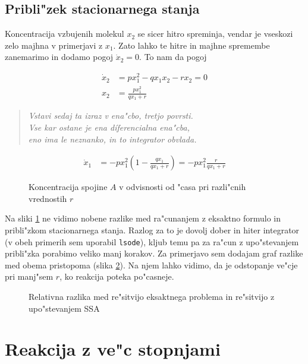 \documentclass[a4paper,10pt]{article}
\begin{document}
\subsection{Pribli"zek stacionarnega stanja}
Koncentracija vzbujenih molekul $x_2$ se sicer hitro spreminja, vendar je vseskozi zelo majhna v primerjavi z $x_1$. Zato lahko te hitre in majhne spremembe zanemarimo in dodamo pogoj $\dot x_2 = 0$. To nam da pogoj

\begin{align}
 \dot x_2 &= p x_1^2 - q x_1 x_2 - r x_2 = 0\\
 x_2 &= \frac{px_1^2}{qx_1 + r}
\end{align}

\begin{verse}
\textit{Vstavi sedaj ta izraz v ena"cbo, tretjo povrsti. \\%
Vse kar ostane je ena d\'iferencialna ena"cba, \\
eno ima le neznanko, in to integrator obvlada. }
\end{verse}

\begin{align}
\dot x_1 &= -p x_1^2 \left( 1 - \frac{qx_1}{qx_1 + r} \right) = -px_1^2 \frac{r}{qx_1 + r}
\end{align}

\begin{figure}
 
  \caption{Koncentracija spojine $A$ v odvisnosti od "casa pri razli"cnih vrednostih $r$}
  \label{fig:binarna}
\end{figure}

Na sliki \ref{fig:binarna} ne vidimo nobene razlike med ra"cunanjem z eksaktno formulo in pribli"zkom stacionarnega stanja. Razlog za to je dovolj dober in hiter integrator (v obeh primerih sem uporabil \texttt{lsode}), kljub temu pa za ra"cun z upo"stevanjem pribli"zka porabimo veliko manj korakov. Za primerjavo sem dodajam graf razlike med obema pristopoma (slika \ref{fig:binarna-dif}). Na njem lahko vidimo, da je odstopanje ve"cje pri manj"sem $r$, ko reakcija poteka po"casneje. 

\begin{figure}
  
  \caption{Relativna razlika med re"sitvijo eksaktnega problema in re"sitvijo z upo"stevanjem SSA}
  \label{fig:binarna-dif}
\end{figure}

\section{Reakcija z ve"c stopnjami}
\end{document}
